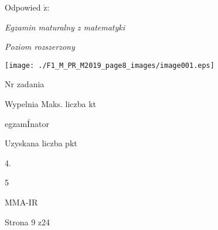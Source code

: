 \documentclass[a4paper,12pt]{article}
\begin{document}
Odpowied $\acute{\mathrm{z}}$:

{\it Egzamin maturalny z matematyki}

{\it Poziom rozszerzony}
\begin{center}
\texttt{[image: ./F1\_M\_PR\_M2019\_page8\_images/image001.eps]}
\end{center}
Nr zadania

Wypelnia Maks. liczba kt

egzamÍnator

Uzyskana liczba pkt

4.

5

MMA-IR

Strona 9 z24
\end{document}
